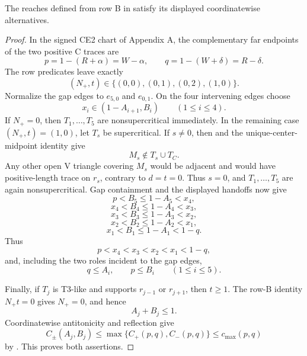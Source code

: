 \begin{lemma}
\label{lem:appendix-two-gap-common-pair-adapter}
The reaches defined from row B in
 satisfy its displayed
coordinatewise alternatives.
\end{lemma}

\begin{proof}
In the signed CE2 chart of Appendix A, the complementary far endpoints of
the two positive C traces are
\[
 p=1-(R+\alpha)=W-\alpha,
 \qquad
 q=1-(W+\delta)=R-\delta.
\]
The row predicates leave exactly
\[
 (N_+,t)\in
 \{(0,0),(0,1),(0,2),(1,0)\}.
\]
Normalize the gap edges to \(e_{5,0}\) and \(e_{0,1}\).  On the four
intervening edges choose
\[
 x_i\in(1-A_{i+1},B_i)
 \qquad(1\le i\le4).
\]
If \(N_+=0\), then \(T_1,\ldots,T_5\) are nonsupercritical immediately.
In the remaining case \((N_+,t)=(1,0)\), let \(T_s\) be supercritical.  If
\(s\ne0\), then  and the unique-center-midpoint
identity give
\[
 M_s\notin T_s\cup T_C.
\]
Any other open V triangle covering \(M_s\) would be adjacent and would have
positive-length trace on \(r_s\), contrary to \(d=t=0\).  Thus \(s=0\), and
\(T_1,\ldots,T_5\) are again nonsupercritical.  Gap containment and the
displayed handoffs now give
\[
 p<B_5\le1-A_5<x_4,
\]
\[
 x_4<B_4\le1-A_4<x_3,
\]
\[
 x_3<B_3\le1-A_3<x_2,
\]
\[
 x_2<B_2\le1-A_2<x_1,
\]
\[
 x_1<B_1\le1-A_1<1-q.
\]
Thus
\[
 p<x_4<x_3<x_2<x_1<1-q,
\]
and, including the two roles incident to the gap edges,
\[
 q\le A_i,
 \qquad
 p\le B_i
 \qquad(1\le i\le5).
\]

Finally, if \(T_j\) is T3-like and supports \(r_{j-1}\) or \(r_{j+1}\),
then \(t\ge1\).  The row-B identity \(N_+t=0\) gives \(N_+=0\), and hence
\[
 A_j+B_j\le1.
\]
Coordinatewise antitonicity and reflection give
\[
 C_\pm(A_j,B_j)
 \le
 \max\{C_+(p,q),C_-(p,q)\}
 \le c_{\max}(p,q)
\]
by .  This proves both assertions.
\end{proof}